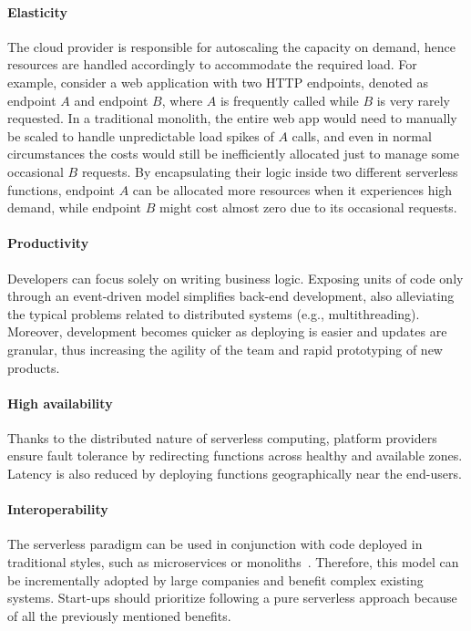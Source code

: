 \paragraph{\textbf{Elasticity}} The cloud provider is responsible for autoscaling the capacity
on demand, hence resources are handled accordingly to accommodate the required load.
For example, consider a web application with two HTTP endpoints, denoted as endpoint $A$ and endpoint $B$,
where $A$ is frequently called while $B$ is very rarely requested.
In a traditional monolith, the entire web app would need to manually be scaled
to handle unpredictable load spikes of $A$ calls, and even in normal circumstances
the costs would still be inefficiently allocated just to manage some occasional $B$ requests.
By encapsulating their logic inside two different serverless functions,
endpoint $A$ can be allocated more resources when it experiences high demand,
while endpoint $B$ might cost almost zero due to its occasional requests.

\paragraph{\textbf{Productivity}} Developers can focus solely on writing
business logic. Exposing units of code only through an event-driven model simplifies back-end development,
also alleviating the typical problems related to distributed systems (e.g., multithreading).
Moreover, development becomes quicker as deploying is easier and updates are granular,
thus increasing the agility of the team and rapid prototyping of new products.

\paragraph{\textbf{High availability}} Thanks to the distributed nature of serverless computing,
platform providers ensure fault tolerance by redirecting functions across healthy and available zones.
Latency is also reduced by deploying functions geographically near the end-users.

\paragraph{\textbf{Interoperability}} The serverless paradigm can be used in
conjunction with code deployed in traditional styles,
such as microservices or monoliths~\cite{serverless-wikipedia}.
Therefore, this model can be incrementally adopted by large companies and benefit
complex existing systems. Start-ups should prioritize following a pure serverless approach
because of all the previously mentioned benefits.

